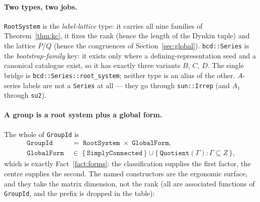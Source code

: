 \documentclass[11pt,a4paper]{article}
\theoremstyle{plain}
\theoremstyle{definition}
\newcommand{\code}[1]{\texttt{#1}}
\begin{document}
\paragraph{Two types, two jobs.} \code{RootSystem} is the
\emph{label-lattice} type: it carries all nine families of
Theorem~\ref{thm:kc}, it fixes the rank (hence the length of the Dynkin tuple)
and the lattice $P/Q$ (hence the congruences of
Section~\ref{sec:global}). \code{bcd::Series} is the \emph{bootstrap-family}
key: it exists only where a defining-representation seed and a canonical
catalogue exist, so it has exactly three variants $B$, $C$, $D$. The single
bridge is \code{bcd::Series::root\_system}; neither type is an alias of the
other. $A$-series labels are not a \code{Series} at all --- they go through
\code{sun::Irrep} (and $A_1$ through \code{su2}).

\paragraph{A group is a root system plus a global form.} The whole of
\code{GroupId} is
\begin{align*}
  \code{GroupId} \;&=\; \code{RootSystem} \;\times\; \code{GlobalForm}, \\
  \code{GlobalForm} \;&\in\; \{\,\code{SimplyConnected}\,\}\cup
                        \{\,\code{Quotient}(\Gamma) : \Gamma\subseteq Z\,\},
\end{align*}
which is exactly Fact~\ref{fact:forms}: the classification supplies the first
factor, the centre supplies the second. The named constructors are the
ergonomic surface, and they take the matrix dimension, not the rank
(all are associated functions of \code{GroupId}, and the prefix is dropped in
the table):
\end{document}
